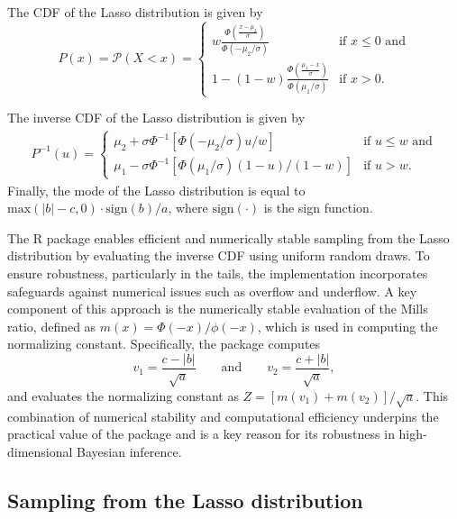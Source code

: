 The CDF of the Lasso distribution is given by
$$
\displaystyle 
P(x) = \mathcal{P}(X < x) 
     = \left\{ \begin{array}{ll}
\displaystyle 
w\frac{\Phi\left( 
\frac{x - \mu_2}{\sigma}\right)}{\Phi(-\mu_2/\sigma)} 
    & \mbox{if $x\le 0$ and}
\\ [2ex]
\displaystyle  1 - (1 - w)\frac{\Phi(\frac{\mu_1 - x}{\sigma})}{\Phi(\mu_1/\sigma)}
    & \mbox{if $x> 0$}.
\end{array} 
\right.
$$
 
The inverse CDF of the Lasso distribution is given by
\begin{align}\label{equ:inv_CDF}
    P^{-1}(u) = \left\{
\begin{array}{ll}
\mu_2 + \sigma\Phi^{-1}[\Phi(-\mu_2/\sigma) u/w] 
    & \mbox{if $u\le w$ and} 
\\ [2ex]
\mu_1 - \sigma\Phi^{-1}[\Phi(\mu_1/\sigma) (1 - u)/(1-w) ]
    & \mbox{if $u> w$}.
\end{array} 
\right.
\end{align}
Finally, the mode of the Lasso distribution is equal to $\mbox{max}(|b| - c,0)\cdot\mbox{sign}(b)/a$, where $\mbox{sign}(\cdot)$ is the sign function. 

The R package  enables efficient and numerically stable sampling from the Lasso distribution by evaluating the inverse CDF using uniform random draws. To ensure robustness, particularly in the tails, the implementation incorporates safeguards against numerical issues such as overflow and underflow. A key component of this approach is the numerically stable evaluation of the Mills ratio, defined as $m(x) = \Phi(-x)/\phi(-x)$, which is used in computing the normalizing constant. Specifically, the package computes 
$$
v_{1}=\frac{c-\left|b\right|}{\sqrt{a}} 
\qquad 
\mbox{and} \qquad  
v_{2}=\frac{c+\left|b\right|}{\sqrt{a}},
$$ 
and evaluates the normalizing constant as
$Z = \left[m\left(v_{1}\right)+m\left(v_{2}\right)\right]/\sqrt{a}$. This combination of numerical stability and computational efficiency underpins the practical value of the package and is a key reason for its robustness in high-dimensional Bayesian inference.







\subsection{Sampling from the Lasso distribution}
\label{sec:lasso_samples}


